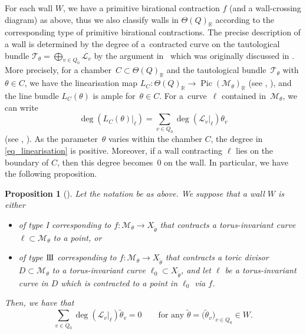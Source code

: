 \documentclass[pdftex]{sigma}
\numberwithin{equation}{section}
\newtheorem{Proposition}[Theorem]{Proposition}
\theoremstyle{definition}
\newcommand{\RR}{\mathbb{R}}
\newcommand{\calL}{\mathcal{L}}
\newcommand{\calM}{\mathcal{M}}
\newcommand{\calT}{\mathcal{T}}
\newcommand{\Pic}{\operatorname{Pic}}
\newcommand{\typeIII}{{\rm I\hspace{-0.7pt}I\hspace{-0.7pt}I}}
\begin{document}
For each wall $W$, we have a primitive birational contraction $f$ (and a wall-crossing diagram) as above, thus we also classify walls in $\Theta(Q)_\RR$
according to the corresponding type of primitive birational contractions.
The precise description of a wall is determined by the degree of a~contracted curve on the tautological bundle $\calT_\theta=\bigoplus_{v\in Q_0}\calL_v$
by the argument in~\cite{IU_anycrepant} which was originally discussed in \cite{CrawIshii}.
More precisely, for a chamber~$C\subset\Theta(Q)_\RR$ and the tautological bundle~$\calT_\theta$ with $\theta\in C$, we have the linearisation map $L_C\colon \Theta(Q)_\RR\to \Pic(\calM_\theta)_\RR$ (see \cite[Section~3.2]{CrawIshii}, \cite[(4.1)]{IU_anycrepant}), and the line bundle $L_C(\theta)$ is ample for~$\theta\in C$. For a~curve~$\ell$ contained in~$\calM_\theta$, we can write
\begin{equation}\label{eq_linearisation}
\deg(L_C(\theta) |_\ell)=\sum_{v\in Q_0}\deg(\calL_v |_\ell)\theta_v
\end{equation}
(see \cite[equation~(5.3)]{CrawIshii}, \cite[equation~(9.6)]{IU_anycrepant}). As the parameter~$\theta$ varies within the chamber $C$, the degree in \eqref{eq_linearisation} is positive.
Moreover, if a wall contracting $\ell$ lies on the boundary of $C$, then this degree becomes~$0$ on the wall. In particular, we have the following proposition.

\begin{Proposition}[{\cite[Lemmas~11.21 and 11.30]{IU_anycrepant}}]\label{prop_equation_wall}
Let the notation be as above. We suppose that a wall $W$ is either
\begin{itemize}\itemsep=0pt
\item of type {\rm I} corresponding to $f\colon \calM_\theta\rightarrow X_{\tilde{\theta}}$ that contracts a torus-invariant curve $\ell\subset\calM_\theta$ to a point, or
\item of type $\typeIII$ corresponding to $f\colon \calM_\theta\rightarrow X_{\tilde{\theta}}$ that contracts a toric divisor $D\subset\calM_\theta$ to
a torus-invariant curve $\ell_0\subset X_{\tilde{\theta}}$,
and let $\ell$ be a torus-invariant curve in $D$ which is contracted to a point in $\ell_0$ via $f$.
\end{itemize}
Then, we have that
\begin{equation}
\sum_{v\in Q_0}\deg(\calL_v |_\ell)\tilde{\theta}_v=0 \qquad \text{for any $\tilde{\theta}=\bigl(\tilde{\theta}_v\bigr)_{v\in Q_0}\in W$.}
\label{eq_wall_equation}
\end{equation}
\end{Proposition}
\end{document}
